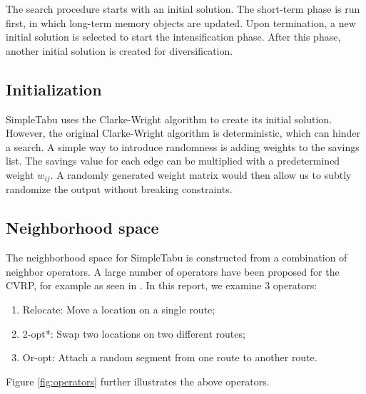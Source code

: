 \documentclass[12pt]{report}
\begin{document}
The search procedure starts with an initial solution. The short-term phase is run first, in which long-term memory objects are updated. Upon termination, a new initial solution is selected to start the intensification phase. After this phase, another initial solution is created for diversification.

\subsection{Initialization}
SimpleTabu uses the Clarke-Wright algorithm to create its initial solution. However, the original Clarke-Wright algorithm is deterministic, which can hinder a search. A simple way to introduce randomness is adding weights to the savings list. The savings value for each edge can be multiplied with a predetermined weight $w_{ij}$. A randomly generated weight matrix would then allow us to subtly randomize the output without breaking constraints.

\subsection{Neighborhood space}
The neighborhood space for SimpleTabu is constructed from a combination of neighbor operators. A large number of operators have been proposed for the CVRP, for example as seen in \cite{mcnabb2015testing}. In this report, we examine 3 operators:
\begin{enumerate}
	\item Relocate: Move a location on a single route;
	\item 2-opt*: Swap two locations on two different routes;
	\item Or-opt: Attach a random segment from one route to another route.
\end{enumerate}

Figure \ref{fig:operators} further illustrates the above operators.
\end{document}
